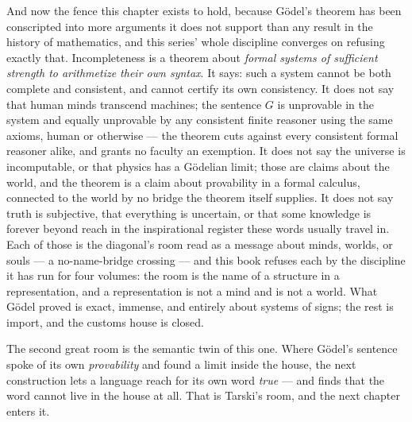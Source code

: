 And now the fence this chapter exists to hold, because G\"odel's theorem
has been conscripted into more arguments it does not support than any
result in the history of mathematics, and this series' whole discipline
converges on refusing exactly that. Incompleteness is a theorem about
\emph{formal systems of sufficient strength to arithmetize their own
syntax}. It says: such a system cannot be both complete and consistent,
and cannot certify its own consistency. It does not say that human minds
transcend machines; the sentence $G$ is unprovable in the system and
equally unprovable by any consistent finite reasoner using the same
axioms, human or otherwise --- the theorem cuts against every consistent
formal reasoner alike, and grants no faculty an exemption. It does not say
the universe is incomputable, or that physics has a G\"odelian limit;
those are claims about the world, and the theorem is a claim about
provability in a formal calculus, connected to the world by no bridge the
theorem itself supplies. It does not say truth is subjective, that
everything is uncertain, or that some knowledge is forever beyond reach in
the inspirational register these words usually travel in. Each of those is
the diagonal's room read as a message about minds, worlds, or souls --- a
no-name-bridge crossing --- and this book refuses each by the discipline
it has run for four volumes: the room is the name of a structure in a
representation, and a representation is not a mind and is not a world.
What G\"odel proved is exact, immense, and entirely about systems of
signs; the rest is import, and the customs house is closed.

The second great room is the semantic twin of this one. Where G\"odel's
sentence spoke of its own \emph{provability} and found a limit inside the
house, the next construction lets a language reach for its own word
\emph{true} --- and finds that the word cannot live in the house at all.
That is Tarski's room, and the next chapter enters it.
